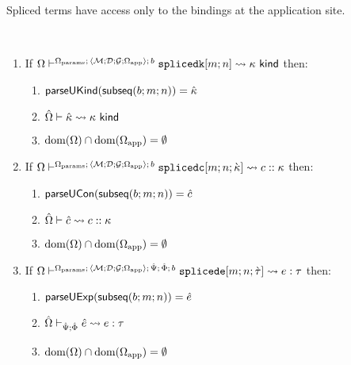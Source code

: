Spliced terms have access only to the bindings at the application site.
\begingroup
\def\thetheorem{\ref{thm:petsm-shadowing-prohibition}}
\begin{theorem}
~
\begin{enumerate}
\item If $\Omega \vdash^{\Omega_\text{params};\,\langle \mathcal{M}; \mathcal{D}; \mathcal{G}; \Omega_\text{app} \rangle;\,b} \texttt{splicedk}[m; n] \leadsto \kappa~\mathsf{kind}$ then:
  \begin{enumerate}
    \item $\mathsf{parseUKind}(\mathsf{subseq}(b; m; n))={\hat\kappa}$
    \item ${\hat\Omega} \vdash {\hat\kappa} \leadsto \kappa~\mathsf{kind}$
    \item $\text{dom}(\Omega) \cap \text{dom}(\Omega_\text{app}) = \emptyset$
  \end{enumerate}
\item If $\Omega \vdash^{\Omega_\text{params};\,\langle \mathcal{M}; \mathcal{D}; \mathcal{G}; \Omega_\text{app} \rangle;\,b} \texttt{splicedc}[m; n; {\grave\kappa}] \leadsto c :: \kappa$ then:
  \begin{enumerate}
    \item $\mathsf{parseUCon}(\mathsf{subseq}(b; m; n))={\hat c}$
    \item ${\hat\Omega} \vdash {\hat c} \leadsto c :: \kappa$
    \item $\text{dom}(\Omega) \cap \text{dom}(\Omega_\text{app}) = \emptyset$
  \end{enumerate}
\item If $\Omega \vdash^{\Omega_\text{params};\,\langle \mathcal{M}; \mathcal{D}; \mathcal{G}; \Omega_\text{app} \rangle;\,\hat{\Psi};\,\hat\Phi;\,b} \texttt{splicede}[m; n; \grave{\tau}] \leadsto e : \tau$ then:
  \begin{enumerate}
    \item $\mathsf{parseUExp}(\mathsf{subseq}(b; m; n))={\hat e}$
    \item ${\hat\Omega} \vdash_{\hat{\Psi}; \hat\Phi} {\hat e} \leadsto e : \tau$
    \item $\text{dom}(\Omega) \cap \text{dom}(\Omega_\text{app}) = \emptyset$
  \end{enumerate}
\end{enumerate}
\end{theorem}
\endgroup
